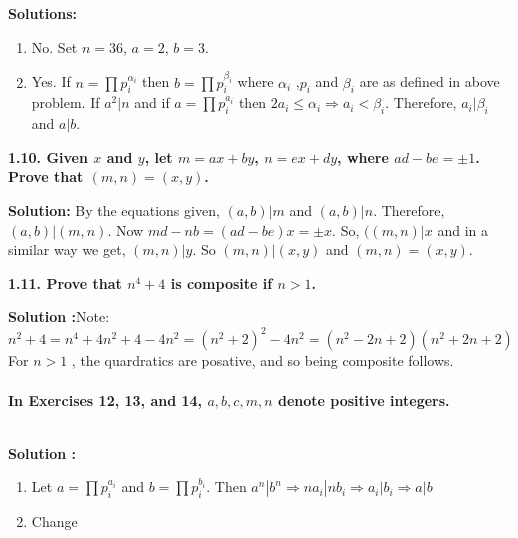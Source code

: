 \documentclass[oneside]{book}
\begin{document}
\textbf{Solutions:}
\begin{enumerate}
    \item No. Set $n=36$, $a=2$, $b=3$.
    \item Yes. If $n=\prod p_i^{\alpha_i}$ then $b=\prod p_i^{\beta_i}$ where $\alpha_i$ ,$p_i$ and $\beta_i$ are as defined in above problem. If $a^2|n$ and if $a=\prod p_i^{a_i}$ then $2a_i\leq \alpha_i\Rightarrow a_i<\beta_i$. Therefore, $a_i|\beta_i$ and $a|b$.
\end{enumerate}

\begin{tcolorbox}
\textbf{1.10. Given $x$ and $y$, let $m = ax+ by$, $n =ex + dy$, where $ad- be = \pm1$. Prove that 
$(m, n) = (x, y)$. }
\end{tcolorbox}
\textbf{Solution: }By the equations given, $(a,b)|m$ and $(a,b)|n$. Therefore, $(a,b)|(m,n)$. Now $md-nb=(ad-be)x=\pm x$.  So, $((m,n)|x$ and in a similar way we get, $(m,n)|y$. So $(m,n)|(x,y)$ and $(m,n)=(x,y)$.

\begin{tcolorbox}
\textbf{1.11. Prove that $n^4 + 4$ is composite if $n > 1$.}
\end{tcolorbox}
\textbf{Solution :}Note:
$$n^2+4=n^4+4n^2+4-4n^2= (n^2+2)^2-4n^2=(n^2-2n+2)(n^2+2n+2)$$
For $n>1$
, the quardratics are  posative, and so being composite follows.\\\\
\textbf{In Exercises 12, 13, and 14, $a, b, c, m, n$ denote positive integers.}\\\\
\textbf{Solution :}
\begin{enumerate}
    \item Let $a=\prod p_i^{a_i}$ and $b=\prod p_i^{b_i}$. Then $a^n|b^n\Rightarrow na_i|nb_i\Rightarrow a_i|b_i\Rightarrow a|b$
    \item Change
\end{enumerate}
\end{document}
